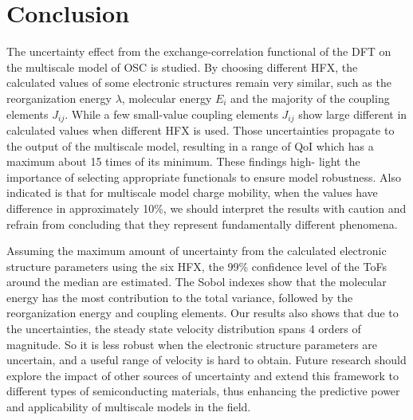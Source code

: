 \documentclass[%
 reprint,
superscriptaddress,
 amsmath,amssymb,
 aps,
prb,
floatfix
]{revtex4-2}
\begin{document}

\section{Conclusion}
The uncertainty effect from the exchange-correlation functional of the DFT on the multiscale model of OSC is studied. By choosing different HFX, the calculated values of some electronic structures remain very similar,
such as the reorganization energy $\lambda$, molecular energy $E_i$ and the majority of the coupling elements  $J_{ij}$. While a few small-value coupling elements $J_{ij}$ show large different in calculated values when different HFX is used. Those uncertainties propagate to the output of the multiscale model, resulting in a range of QoI which has a maximum about 15 times of its minimum. These findings high-
light the importance of selecting appropriate functionals to ensure model robustness. Also indicated is that for multiscale model charge mobility, when the values have difference in approximately 10\%, we should interpret the results with caution and refrain from concluding that they represent fundamentally different phenomena.

Assuming the maximum amount of uncertainty from the calculated electronic structure parameters using the six HFX, the 99\% confidence level of the ToFs around the median are estimated. The Sobol indexes show that the molecular energy has the most contribution to the total variance, followed by the reorganization energy and coupling elements. Our results also shows that due to the uncertainties, the steady state velocity distribution spans 4 orders of magnitude. So it is less robust when
the electronic structure parameters are uncertain, and a useful range of velocity is hard to obtain. Future research should explore the impact of other sources of uncertainty and extend this framework to different types of semiconducting materials, thus enhancing the predictive power and applicability of multiscale models in the field.




\appendix*
\end{document}
